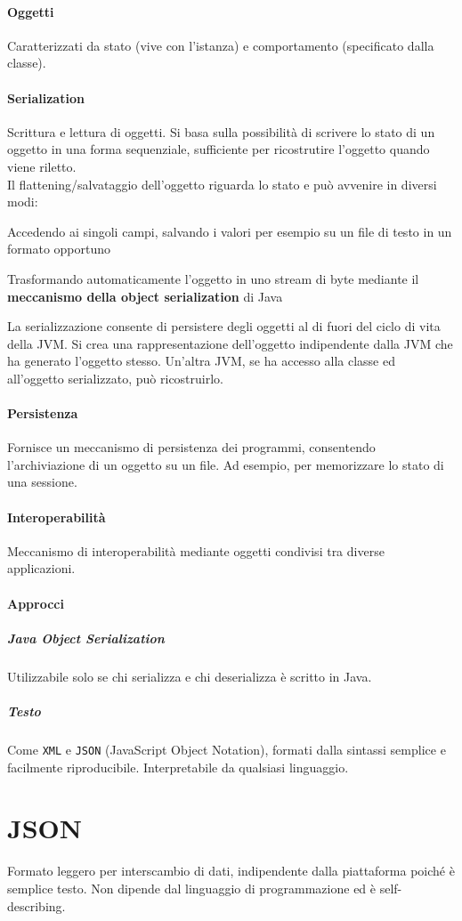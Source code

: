 \documentclass[10pt]{article}
\begin{document}
\paragraph{Oggetti} Caratterizzati da stato (vive con l'istanza) e comportamento (specificato dalla classe).
\paragraph{Serialization} Scrittura e lettura di oggetti. Si basa sulla possibilità di scrivere lo stato di un oggetto in una forma sequenziale, sufficiente per ricostrutire l'oggetto quando viene riletto.\\
Il flattening/salvataggio dell'oggetto riguarda lo stato e può avvenire in diversi modi:
\begin{list}{}{}
	\item Accedendo ai singoli campi, salvando i valori per esempio su un file di testo in un formato opportuno
	\item Trasformando automaticamente l'oggetto in uno stream di byte mediante il \textbf{meccanismo della object serialization} di Java
\end{list}
La serializzazione consente di persistere degli oggetti al di fuori del ciclo di vita della JVM. Si crea una rappresentazione dell'oggetto indipendente dalla JVM che ha generato l'oggetto stesso. Un'altra JVM, se ha accesso alla classe ed all'oggetto serializzato, può ricostruirlo.
\paragraph{Persistenza} Fornisce un meccanismo di persistenza dei programmi, consentendo l'archiviazione di un oggetto su un file. Ad esempio, per memorizzare lo stato di una sessione.
\paragraph{Interoperabilità} Meccanismo di interoperabilità mediante oggetti condivisi tra diverse applicazioni.
\paragraph{Approcci}
\subparagraph{Java Object Serialization} Utilizzabile solo se chi serializza e chi deserializza è scritto in Java.
\subparagraph{Testo} Come \texttt{XML} e \texttt{JSON} (JavaScript Object Notation), formati dalla sintassi semplice e facilmente riproducibile. Interpretabile da qualsiasi linguaggio.
\section{JSON}
Formato leggero per interscambio di dati, indipendente dalla piattaforma poiché è semplice testo. Non dipende dal linguaggio di programmazione ed è self-describing.
\end{document}
